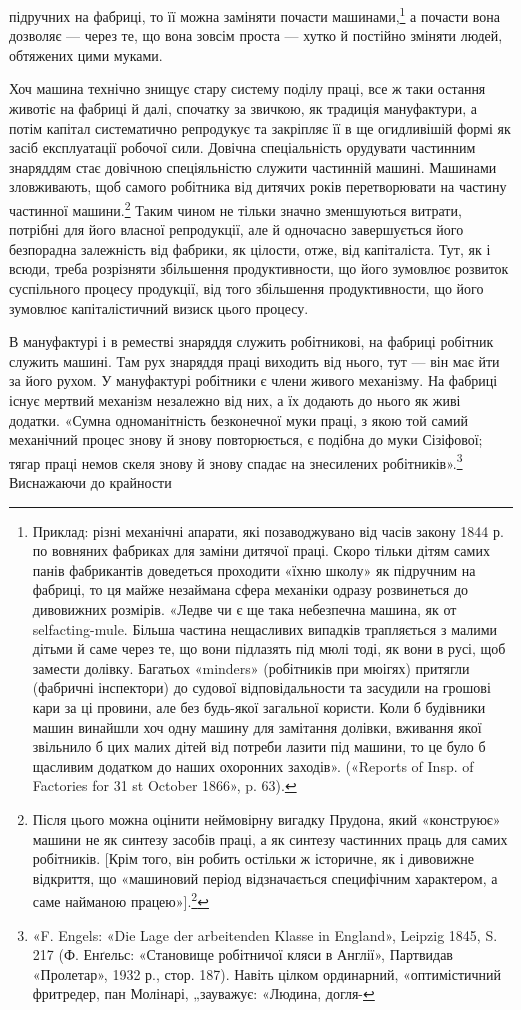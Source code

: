 підручних на фабриці, то її можна заміняти почасти машинами,\footnote{
Приклад: різні механічні апарати, які позаводжувано від часів
закону 1844 р. по вовняних фабриках для заміни дитячої праці. Скоро
тільки дітям самих панів фабрикантів доведеться проходити «їхню школу»
як підручним на фабриці, то ця майже незаймана сфера механіки одразу
розвинеться до дивовижних розмірів. «Ледве чи є ще така небезпечна
машина, як от selfacting-mule. Більша частина нещасливих випадків
трапляється з малими дітьми й саме через те, що вони підлазять під мюлі
тоді, як вони в русі, щоб замести долівку. Багатьох «minders» (робітників
при мюігях) притягли (фабричні інспектори) до судової відповідальности
та засудили на грошові кари за ці провини, але без будь-якої загальної
користи. Коли б будівники машин винайшли хоч одну машину
для замітання долівки, вживання якої звільнило б цих малих дітей від
потреби лазити під машини, то це було б щасливим додатком до наших
охоронних заходів». («Reports of Insp. of Factories for 31 st October
1866», p. 63).
}
а почасти вона дозволяє — через те, що вона зовсім проста —
хутко й постійно зміняти людей, обтяжених цими муками.

Хоч машина технічно знищує стару систему поділу праці,
все ж таки остання животіє на фабриці й далі, спочатку за звичкою,
як традиція мануфактури, а потім капітал систематично
репродукує та закріпляє її в ще огидливішій формі як засіб
експлуатації робочої сили. Довічна спеціальність орудувати
частинним знаряддям стає довічною спеціяльністю служити частинній
машині. Машинами зловживають, щоб самого робітника
від дитячих років перетворювати на частину частинної машини.\footnote{
Після цього можна оцінити неймовірну вигадку Прудона, який
«конструює» машини не як синтезу засобів праці, а як синтезу частинних
праць для самих робітників. [Крім того, він робить остільки ж історичне,
як і дивовижне відкриття, що «машиновий період відзначається специфічним
характером, а саме найманою працею»].\footnote*{
Подане у прямих дужках ми беремо з французького видання. Ред.
}
}
Таким чином не тільки значно зменшуються витрати, потрібні
для його власної репродукції, але й одночасно завершується його
безпорадна залежність від фабрики, як цілости, отже, від капіталіста.
Тут, як і всюди, треба розрізняти збільшення продуктивности,
що його зумовлює розвиток суспільного процесу продукції,
від того збільшення продуктивности, що його зумовлює
капіталістичний визиск цього процесу.

В мануфактурі і в реместві знаряддя служить робітникові,
на фабриці робітник служить машині. Там рух знаряддя праці
виходить від нього, тут — він має йти за його рухом. У мануфактурі
робітники є члени живого механізму. На фабриці існує
мертвий механізм незалежно від них, а їх додають до нього як
живі додатки. «Сумна одноманітність безконечної муки праці, з
якою той самий механічний процес знову й знову повторюється, є
подібна до муки Сізіфової; тягар праці немов скеля знову й знову
спадає на знесилених робітників».\footnote{
«F. Engels: «Die Lage der arbeitenden Klasse in England», Leipzig
1845, S. 217 (Ф. Енґельс: «Становище робітничої кляси в Англії»,
Партвидав «Пролетар», 1932 р., стор. 187). Навіть цілком ординарний,
«оптимістичний фритредер, пан Молінарі, „зауважує: «Людина, догля-
} Виснажаючи до крайности